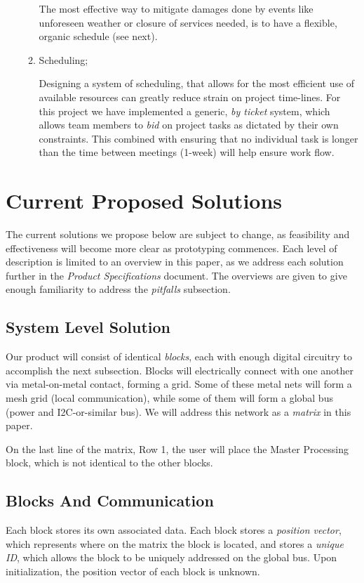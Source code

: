 \begin{enumerate}
\begin{enumerate}
  The most effective way to mitigate damages done by events like unforeseen weather or closure of services needed, is to have a flexible, organic schedule (see next).
  \item Scheduling;

  Designing a system of scheduling, that allows for the most efficient use of available resources can greatly reduce strain on project time-lines. For this project we have implemented a generic, \textit{by ticket} system, which allows team members to \textit{bid} on project tasks as dictated by their own constraints. This combined with ensuring that no individual task is longer than the time between meetings (1-week) will help ensure work flow.
  \end{enumerate}
  \end{enumerate}

\section{Current Proposed Solutions }
  The current solutions we propose below are subject to change, as feasibility and effectiveness will become more clear as prototyping commences. Each level of description is limited to an overview in this paper, as we address each solution further in the \textit{Product  Specifications} document. The overviews are given to give enough familiarity to address the \textit{pitfalls} subsection.
  \subsection{System Level Solution}
    Our product will consist of identical \textit{blocks}, each with enough digital circuitry to accomplish the next subsection. Blocks will electrically connect with one another via metal-on-metal contact, forming a grid. Some of these metal nets will form a mesh grid (local communication), while some of them will form a global bus (power and I2C-or-similar bus). We will address this network as a \textit{matrix} in this paper.

    On the last line of the matrix, Row 1, the user will place the Master Processing block, which is not identical to the other blocks.
  \subsection{Blocks And Communication}
    Each block stores its own associated data. Each block stores a \textit{position vector}, which represents where on the matrix the block is located, and stores a \textit{unique ID}, which allows the block to be uniquely addressed on the global bus. Upon initialization, the position vector of each block is unknown.
